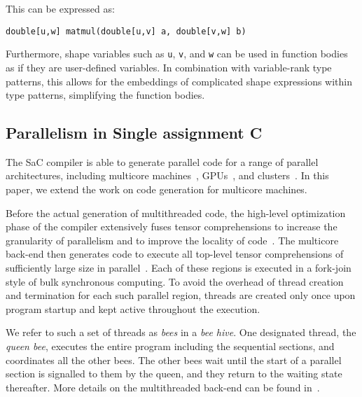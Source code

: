 This can be expressed as:
\begin{verbatim}
double[u,w] matmul(double[u,v] a, double[v,w] b)
\end{verbatim}

Furthermore, shape variables such as \verb|u|, \verb|v|, and \verb|w| can be used in function bodies
as if they are user-defined variables. In combination with variable-rank type patterns, this allows
for the embeddings of complicated shape expressions within type patterns, simplifying the function
bodies.

\subsection{Parallelism in Single assignment C}\label{sac-par}
The SaC compiler is able to generate parallel code for a range of parallel architectures,
including multicore machines~\cite{sac-shared}, GPUs~\cite{sac-gpu,sac-gpu2}, and
clusters~\cite{sac-mpi}. In this paper, we extend the work on code generation for multicore
machines.

Before the actual generation of multithreaded code, the high-level optimization phase of the
compiler extensively fuses tensor comprehensions to increase the granularity of parallelism and to
improve the locality of code~\cite{sac1}. The multicore back-end then generates code to execute all
top-level tensor comprehensions of sufficiently large size in parallel~\cite{sac-shared}. Each of
these regions is executed in a fork-join style of bulk synchronous computing. To avoid the overhead
of thread creation and termination for each such parallel region, threads are created only once upon
program startup and kept active throughout the execution.

We refer to such a set of threads as \textit{bees} in a \textit{bee hive}. One designated thread,
the \textit{queen bee}, executes the entire program including the sequential sections, and
coordinates all the other bees. The other bees wait until the start of a parallel section is
signalled to them by the queen, and they return to the waiting state thereafter. More details on the
multithreaded back-end can be found in~\cite{sac-shared}.
